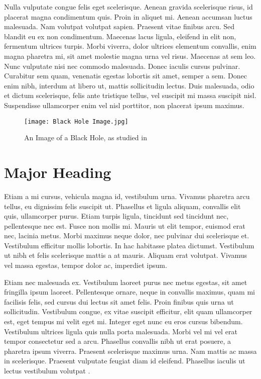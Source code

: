 Nulla vulputate congue felis eget scelerisque. Aenean gravida scelerisque risus, id placerat magna condimentum quis. Proin in aliquet mi. Aenean accumsan luctus malesuada. Nam volutpat volutpat sapien. Praesent vitae finibus arcu. Sed blandit eu ex non condimentum. Maecenas lacus ligula, eleifend in elit non, fermentum ultrices turpis. Morbi viverra, dolor ultrices elementum convallis, enim magna pharetra mi, sit amet molestie magna urna vel risus. Maecenas at sem leo. Nunc vulputate nisi nec commodo malesuada. Donec iaculis cursus pulvinar. Curabitur sem quam, venenatis egestas lobortis sit amet, semper a sem. Donec enim nibh, interdum at libero ut, mattis sollicitudin lectus. Duis malesuada, odio et dictum scelerisque, felis ante tristique tellus, vel suscipit mi massa suscipit nisl. Suspendisse ullamcorper enim vel nisl porttitor, non placerat ipsum maximus.

\begin{figure}[h] %
\centering
\texttt{[image: Black Hole Image.jpg]}
\caption{An Image of a Black Hole, as studied in \textcite{hawking_particle_1993}}
\end{figure}

\section*{Major Heading}
Etiam a mi cursus, vehicula magna id, vestibulum urna. Vivamus pharetra arcu tellus, eu dignissim felis suscipit ut. Phasellus et ligula aliquam, convallis elit quis, ullamcorper purus. Etiam turpis ligula, tincidunt sed tincidunt nec, pellentesque nec est. Fusce non mollis mi. Mauris ut elit tempor, euismod erat nec, lacinia metus. Morbi maximus neque dolor, nec pulvinar dui scelerisque et. Vestibulum efficitur mollis lobortis. In hac habitasse platea dictumst. Vestibulum ut nibh et felis scelerisque mattis a at mauris. Aliquam erat volutpat. Vivamus vel massa egestas, tempor dolor ac, imperdiet ipsum.

Etiam nec malesuada ex. Vestibulum laoreet purus nec metus egestas, sit amet fringilla ipsum laoreet. Pellentesque ornare, neque in convallis maximus, quam mi facilisis felis, sed cursus dui lectus sit amet felis. Proin finibus quis urna ut sollicitudin. Vestibulum congue, ex vitae suscipit efficitur, elit quam ullamcorper est, eget tempus mi velit eget mi. Integer eget nunc eu eros cursus bibendum. Vestibulum ultrices ligula quis nulla porta malesuada. Morbi vel mi vel erat tempor consectetur sed a arcu. Phasellus convallis nibh ut erat posuere, a pharetra ipsum viverra. Praesent scelerisque maximus urna. Nam mattis ac massa in scelerisque. Praesent vulputate feugiat diam id eleifend. Phasellus iaculis ut lectus vestibulum volutpat \autocite{amjad_value_2020}.

\pagebreak

\printbibliography %

